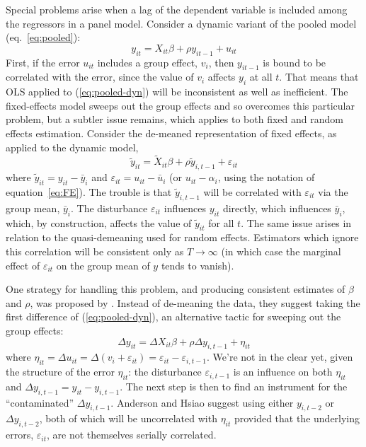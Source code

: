 Special problems arise when a lag of the dependent variable is
included among the regressors in a panel model.  Consider a dynamic
variant of the pooled model (eq.\ \ref{eq:pooled}):
\begin{equation}
\label{eq:pooled-dyn}
y_{it} = X_{it}\beta + \rho y_{it-1} + u_{it}
\end{equation}
First, if the error $u_{it}$ includes a group effect, $v_i$, then
$y_{it-1}$ is bound to be correlated with the error, since the value
of $v_i$ affects $y_i$ at all $t$.  That means that OLS applied to
(\ref{eq:pooled-dyn}) will be inconsistent as well as inefficient.
The fixed-effects model sweeps out the group effects and so overcomes
this particular problem, but a subtler issue remains, which applies to
both fixed and random effects estimation.  Consider the de-meaned
representation of fixed effects, as applied to the dynamic model,
\[
\tilde{y}_{it} = \tilde{X}_{it}\beta + \rho \tilde{y}_{i,t-1} 
  + \varepsilon_{it}
\]
where $\tilde{y}_{it} = y_{it} - \bar{y}_i$ and $\varepsilon_{it} =
u_{it} - \bar{u}_i$ (or $u_{it} - \alpha_i$, using the notation of
equation~\ref{eq:FE}).  The trouble is that $\tilde{y}_{i,t-1}$ will be
correlated with $\varepsilon_{it}$ via the group mean, $\bar{y}_i$.
The disturbance $\varepsilon_{it}$ influences $y_{it}$ directly, which
influences $\bar{y}_i$, which, by construction, affects the value of
$\tilde{y}_{it}$ for all $t$.  The same issue arises in relation to
the quasi-demeaning used for random effects.  Estimators which ignore
this correlation will be consistent only as $T \to \infty$ (in which
case the marginal effect of $\varepsilon_{it}$ on the group mean of 
$y$ tends to vanish).  

One strategy for handling this problem, and producing consistent
estimates of $\beta$ and $\rho$, was proposed by
\cite{anderson-hsiao81}.  Instead of de-meaning the data, they suggest
taking the first difference of (\ref{eq:pooled-dyn}), an alternative
tactic for sweeping out the group effects:
\begin{equation}
\label{eq:fe-dyn}
\Delta y_{it} = \Delta X_{it}\beta + \rho \Delta y_{i,t-1} 
  + \eta_{it}
\end{equation}
where $\eta_{it} = \Delta u_{it} = \Delta(v_i + \varepsilon_{it}) =
\varepsilon_{it} - \varepsilon_{i,t-1}$.  We're not in the clear yet,
given the structure of the error $\eta_{it}$: the disturbance
$\varepsilon_{i,t-1}$ is an influence on both $\eta_{it}$ and $\Delta
y_{i,t-1} = y_{it} - y_{i,t-1}$.  The next step is then to find an
instrument for the ``contaminated'' $\Delta y_{i,t-1}$. Anderson and
Hsiao suggest using either $y_{i,t-2}$ or $\Delta y_{i,t-2}$, both of
which will be uncorrelated with $\eta_{it}$ provided that the
underlying errors, $\varepsilon_{it}$, are not themselves serially
correlated.

